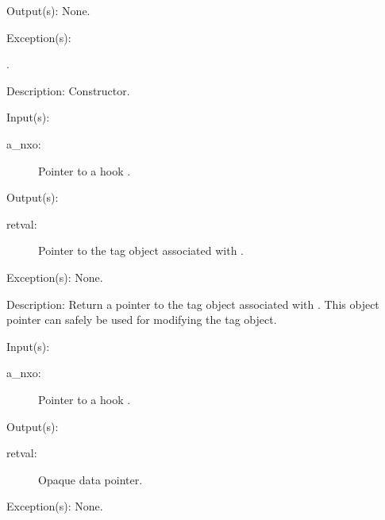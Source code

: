 \begin{capi}
\begin{capilist}
	\item[Output(s): ] None.
	\item[Exception(s): ]
		\begin{description}\item[]
		\item[.]
		\end{description}
	\item[Description: ]
		Constructor.
	\end{capilist}
\label{nxo_hook_tag_get}
	\begin{capilist}
	\item[Input(s): ]
		\begin{description}\item[]
		\item[a\_nxo: ]
			Pointer to a hook .
		\end{description}
	\item[Output(s): ]
		\begin{description}\item[]
		\item[retval: ]
			Pointer to the tag object associated with .
		\end{description}
	\item[Exception(s): ] None.
	\item[Description: ]
		Return a pointer to the tag object associated with
		.  This object pointer can safely be used for
		modifying the tag object.
	\end{capilist}
\label{nxo_hook_data_get}
	\begin{capilist}
	\item[Input(s): ]
		\begin{description}\item[]
		\item[a\_nxo: ]
			Pointer to a hook \classname{nxo}.
		\end{description}
	\item[Output(s): ]
		\begin{description}\item[]
		\item[retval: ]
			Opaque data pointer.
		\end{description}
	\item[Exception(s): ] None.

\end{capilist}
\end{capi}
